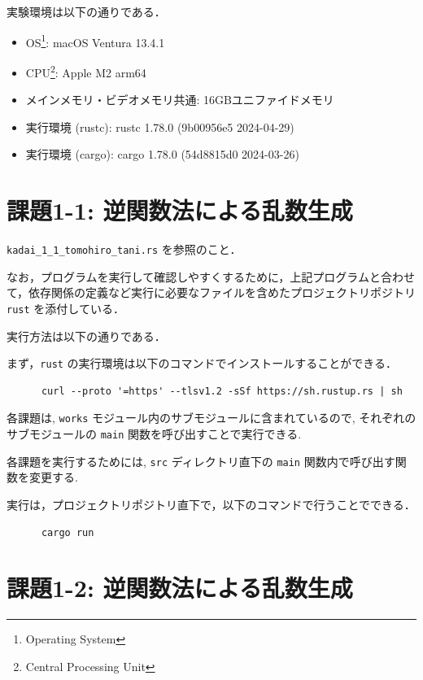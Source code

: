\documentclass[fleqn, a4paper. 12pt]{jsarticle}
\begin{document}
    実験環境は以下の通りである．

    \begin{itemize}
      \item OS\footnote{Operating System}: macOS Ventura 13.4.1
      \item CPU\footnote{Central Processing Unit}: Apple M2 arm64\footnotemark[4]
      \item メインメモリ・ビデオメモリ共通: 16GBユニファイドメモリ\footnotemark[4]
      \item 実行環境 (rustc): rustc 1.78.0 (9b00956e5 2024-04-29)
      \item 実行環境 (cargo): cargo 1.78.0 (54d8815d0 2024-03-26)
    \end{itemize}

  \newpage
  \section*{課題1-1: 逆関数法による乱数生成}

    \texttt{kadai\_1\_1\_tomohiro\_tani.rs} を参照のこと．

    \quad

    なお，プログラムを実行して確認しやすくするために，上記プログラムと合わせて，依存関係の定義など実行に必要なファイルを含めたプロジェクトリポジトリ \texttt{rust} を添付している．

    実行方法は以下の通りである．

    まず，\texttt{rust} の実行環境は以下のコマンドでインストールすることができる．

    \begin{verbatim}
      curl --proto '=https' --tlsv1.2 -sSf https://sh.rustup.rs | sh
    \end{verbatim}

    各課題は, \texttt{works} モジュール内のサブモジュールに含まれているので, それぞれのサブモジュールの \texttt{main} 関数を呼び出すことで実行できる.

    各課題を実行するためには, \texttt{src} ディレクトリ直下の \texttt{main} 関数内で呼び出す関数を変更する.

    実行は，プロジェクトリポジトリ直下で，以下のコマンドで行うことでできる．

    \begin{verbatim}
      cargo run
    \end{verbatim}

  \newpage
  \section*{課題1-2: 逆関数法による乱数生成}
\end{document}
